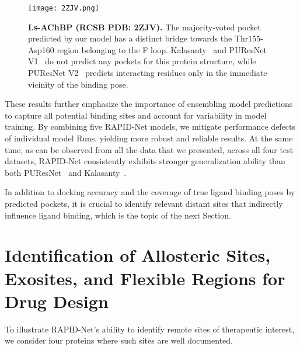 \documentclass[10pt,conference]{IEEEtran}
\begin{document}
\begin{figure*}[]{}
  \centering
  \texttt{[image: 2ZJV.png]}
  \caption{\textbf{Ls-AChBP (RCSB PDB: 2ZJV).} The majority-voted pocket predicted by our model has a distinct bridge towards the Thr155-Asp160 region belonging to the F loop. Kalasanty~\cite{stepniewska2020improving} and PUResNet V1~\cite{kandel2021puresnet} do not predict any pockets for this protein structure, while PUResNet V2~\cite{jeevan2024puresnetv2} predicts interacting residues only in the immediate vicinity of the binding pose.}
  \label{2ZJV_1_Fig}
\end{figure*}


These results further emphasize the importance of ensembling model predictions to capture all potential binding sites and account for variability in model training. By combining five RAPID-Net models, we mitigate performance defects of individual model Runs, yielding more robust and reliable results. At the same time, as can be observed from all the data that we presented, across all four test datasets, RAPID-Net consistently exhibits stronger generalization ability than both PUResNet~\cite{kandel2021puresnet} and Kalasanty~\cite{stepniewska2020improving}. 


In addition to docking accuracy and the coverage of true ligand binding poses by predicted pockets, it is crucial to identify relevant distant sites that indirectly influence ligand binding, which is the topic of the next Section.













\section{Identification of Allosteric Sites, Exosites, and Flexible Regions for Drug Design}
\label{Distant_Sites}


To illustrate RAPID-Net's ability to identify remote sites of therapeutic interest, we consider four proteins where such sites are well documented.
\end{document}
